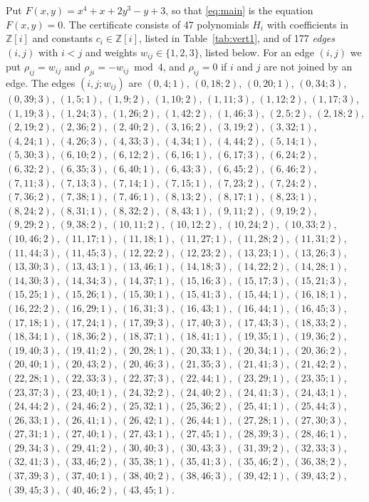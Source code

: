 \documentclass[11pt]{article}
\newcommand{\Z}{\mathbb{Z}}
\begin{document}
Put $F(x,y)=x^{4}+x+2y^{3}-y+3$, so that \eqref{eq:main} is the equation $F(x,y)=0$. The certificate consists of 47 polynomials $H_i$ with coefficients in $\Z[i]$ and constants $c_i\in\Z[i]$, listed in Table~\ref{tab:vert1}, and of 177 \emph{edges} $(i,j)$ with $i<j$ and weights $w_{ij}\in\{1,2,3\}$, listed below. For an edge $(i,j)$ we put $\rho_{ij}=w_{ij}$ and $\rho_{ji}=-w_{ij}\bmod 4$, and $\rho_{ij}=0$ if $i$ and $j$ are not joined by an edge.
The edges $(i,j;w_{ij})$ are $(0,4;1)$, $(0,18;2)$, $(0,20;1)$, $(0,34;3)$, $(0,39;3)$, $(1,5;1)$, $(1,9;2)$, $(1,10;2)$, $(1,11;3)$, $(1,12;2)$, $(1,17;3)$, $(1,19;3)$, $(1,24;3)$, $(1,26;2)$, $(1,42;2)$, $(1,46;3)$, $(2,5;2)$, $(2,18;2)$, $(2,19;2)$, $(2,36;2)$, $(2,40;2)$, $(3,16;2)$, $(3,19;2)$, $(3,32;1)$, $(4,24;1)$, $(4,26;3)$, $(4,33;3)$, $(4,34;1)$, $(4,44;2)$, $(5,14;1)$, $(5,30;3)$, $(6,10;2)$, $(6,12;2)$, $(6,16;1)$, $(6,17;3)$, $(6,24;2)$, $(6,32;2)$, $(6,35;3)$, $(6,40;1)$, $(6,43;3)$, $(6,45;2)$, $(6,46;2)$, $(7,11;3)$, $(7,13;3)$, $(7,14;1)$, $(7,15;1)$, $(7,23;2)$, $(7,24;2)$, $(7,36;2)$, $(7,38;1)$, $(7,46;1)$, $(8,13;2)$, $(8,17;1)$, $(8,23;1)$, $(8,24;2)$, $(8,31;1)$, $(8,32;2)$, $(8,43;1)$, $(9,11;2)$, $(9,19;2)$, $(9,29;2)$, $(9,38;2)$, $(10,11;2)$, $(10,12;2)$, $(10,24;2)$, $(10,33;2)$, $(10,46;2)$, $(11,17;1)$, $(11,18;1)$, $(11,27;1)$, $(11,28;2)$, $(11,31;2)$, $(11,44;3)$, $(11,45;3)$, $(12,22;2)$, $(12,23;2)$, $(13,23;1)$, $(13,26;3)$, $(13,30;3)$, $(13,43;1)$, $(13,46;1)$, $(14,18;3)$, $(14,22;2)$, $(14,28;1)$, $(14,30;3)$, $(14,34;3)$, $(14,37;1)$, $(15,16;3)$, $(15,17;3)$, $(15,21;3)$, $(15,25;1)$, $(15,26;1)$, $(15,30;1)$, $(15,41;3)$, $(15,44;1)$, $(16,18;1)$, $(16,22;2)$, $(16,29;1)$, $(16,31;3)$, $(16,43;1)$, $(16,44;1)$, $(16,45;3)$, $(17,18;1)$, $(17,24;1)$, $(17,39;3)$, $(17,40;3)$, $(17,43;3)$, $(18,33;2)$, $(18,34;1)$, $(18,36;2)$, $(18,37;1)$, $(18,41;1)$, $(19,35;1)$, $(19,36;2)$, $(19,40;3)$, $(19,41;2)$, $(20,28;1)$, $(20,33;1)$, $(20,34;1)$, $(20,36;2)$, $(20,40;1)$, $(20,43;2)$, $(20,46;3)$, $(21,35;3)$, $(21,41;3)$, $(21,42;2)$, $(22,28;1)$, $(22,33;3)$, $(22,37;3)$, $(22,44;1)$, $(23,29;1)$, $(23,35;1)$, $(23,37;3)$, $(23,40;1)$, $(24,32;2)$, $(24,40;2)$, $(24,41;3)$, $(24,43;1)$, $(24,44;2)$, $(24,46;2)$, $(25,32;1)$, $(25,36;2)$, $(25,41;1)$, $(25,44;3)$, $(26,33;1)$, $(26,41;1)$, $(26,42;1)$, $(26,44;1)$, $(27,28;1)$, $(27,30;3)$, $(27,31;1)$, $(27,40;1)$, $(27,43;1)$, $(27,45;1)$, $(28,39;3)$, $(28,46;1)$, $(29,34;3)$, $(29,41;2)$, $(30,40;3)$, $(30,43;3)$, $(31,39;2)$, $(32,33;3)$, $(32,41;3)$, $(33,46;2)$, $(35,38;1)$, $(35,41;3)$, $(35,46;2)$, $(36,38;2)$, $(37,39;3)$, $(37,40;1)$, $(38,40;2)$, $(38,46;3)$, $(39,42;1)$, $(39,43;2)$, $(39,45;3)$, $(40,46;2)$, $(43,45;1)$.
\end{document}
